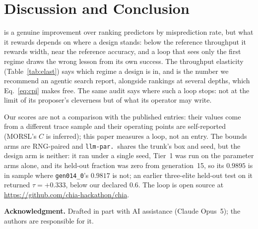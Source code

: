 \documentclass[conference]{IEEEtran}
\newcommand{\vfs}{\text{VFS}}
\begin{document}
\section{Discussion and Conclusion}

\vfs{} is a genuine improvement over ranking predictors by misprediction rate,
but what it rewards depends on where a design stands: below the reference
throughput it rewards width, near the reference accuracy, and a loop that
sees only the first regime draws the wrong lesson from its own success. The
throughput elasticity (Table~\ref{tab:elast}) says which regime a design is in,
and is the number we recommend an agentic search report, alongside rankings at
several depths, which Eq.~\eqref{eq:cpi} makes free. The same audit says where
such a loop stops: not at the limit of its proposer's cleverness but of what its
operator may write.

Our scores are not a comparison with the published entries: their values come
from a different trace sample and their operating points are self-reported
(MORSL's $C$ is inferred); this paper measures a loop, not an entry. The bounds
arms are RNG-paired and \texttt{llm-par.}\ shares the trunk's box and seed, but
the design arm is neither: it ran under a single seed, Tier~1 was run on the
parameter arms alone, and its held-out fraction was zero from generation~15, so
its $0.9895$ is in sample where \texttt{gen014\_0}'s $0.9817$ is not; an earlier
three-elite held-out test on it returned $\tau=+0.333$, below our declared
$0.6$. The loop is open source at \url{https://github.com/chia-hackathon/chia}.

\noindent\textbf{Acknowledgment.} Drafted in part with AI assistance (Claude
Opus~5); the authors are responsible for it.
\end{document}
